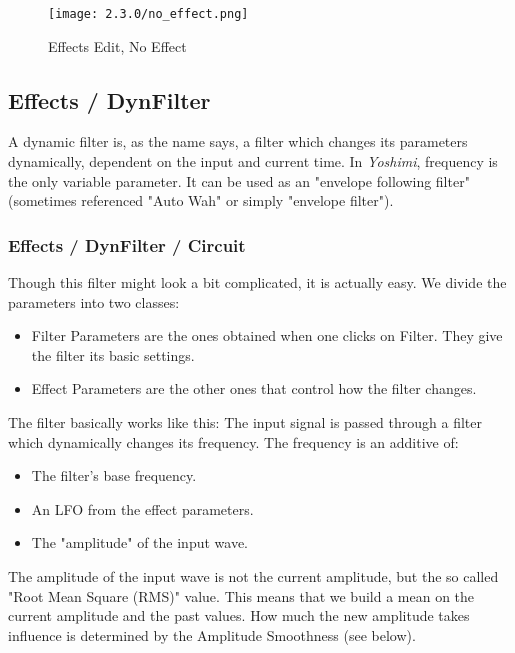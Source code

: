 \begin{figure}[H]
   \centering
   \texttt{[image: 2.3.0/no\_effect.png]}
   \caption{Effects Edit, No Effect}
   \label{fig:effects_edit_none}
\end{figure}

\subsection{Effects / DynFilter}
\label{subsec:effects_edit_dynfilter}

   A dynamic filter is, as the name says, a filter which changes its
   parameters dynamically, dependent on the input and current time. In
   \textsl{Yoshimi}, frequency is the only variable parameter. It can be
   used as an "envelope following filter" (sometimes referenced "Auto Wah" or
   simply "envelope filter").

\subsubsection{Effects / DynFilter / Circuit}
\label{subsubsec:effects_edit_dynfilter_circuit}

   Though this filter might look a bit complicated, it is actually easy. We
   divide the parameters into two classes:

   \begin{itemize}
      \item Filter Parameters are the ones obtained when one clicks on Filter.
         They give the filter its basic settings.
      \item Effect Parameters are the other ones that control how the filter
         changes.
   \end{itemize}

   The filter basically works like this: The input signal is passed through a
   filter which dynamically changes its frequency. The frequency is an
   additive of:

   \begin{itemize}
      \item The filter’s base frequency.
      \item An LFO from the effect parameters.
      \item The "amplitude" of the input wave.
   \end{itemize}

   The amplitude of the input wave is not the current amplitude, but the so
   called "Root Mean Square (RMS)" value. This means that we build a mean on
   the current amplitude and the past values. How much the new amplitude
   takes influence is determined by the Amplitude Smoothness (see below).


